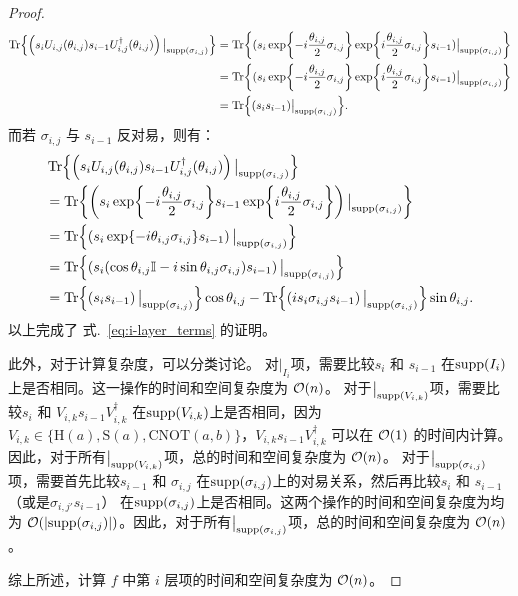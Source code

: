 \begin{proof}
    \begin{equation}
      \begin{aligned}
      \Tr{\left(s_i U_{i,j}(\theta_{i,j}) s_{i-1} U_{i,j}^\dagger(\theta_{i,j})\right)\big|_{\text{supp} \left( \sigma_{i,j} \right)}}
      &=\Tr{(s_i \exp{-i \frac{\theta_{i,j}}{2}\sigma_{i,j} }  \exp{i \frac{\theta_{i,j}}{2}\sigma_{i,j} }s_{i-1}) \big|_{\text{supp} \left( \sigma_{i,j} \right)}}\\
      &=\Tr{(s_i \exp{-i \frac{\theta_{i,j}}{2}\sigma_{i,j} } \exp{i \frac{\theta_{i,j}}{2}\sigma_{i,j} }s_{i-1}) \big|_{{\text{supp} \left( \sigma_{i,j} \right)}}}\\
      &=\Tr{(s_i s_{i-1})\big|_{{\text{supp} \left( \sigma_{i,j} \right)}}}.
    \end{aligned}
    \end{equation}
    而若 $\sigma_{i,j}$ 与 $s_{i-1}$ 反对易，则有：
    \begin{equation}
      \begin{aligned}
      &\Tr{\left(s_i U_{i,j}(\theta_{i,j}) s_{i-1} U_{i,j}^\dagger(\theta_{i,j})\right)\big|_{\text{supp} \left( \sigma_{i,j} \right)}}\\
      &=\Tr{ \left(s_i\exp{-i \frac{\theta_{i,j}}{2}\sigma_{i,j} } s_{i-1}\exp{i \frac{\theta_{i,j}}{2}\sigma_{i,j}}\right) \big|_{\text{supp} \left( \sigma_{i,j} \right)}}\\
      &=\Tr{\left( s_i  \exp{-i\theta_{i,j}\sigma_{i,j}} s_{i-1}\right) \big|_{\text{supp} \left( \sigma_{i,j} \right)}}\\
      &=\Tr{ \left(s_i (\cos{\theta_{i,j}}\mathbb{I}-i\sin{\theta_{i,j}}\sigma_{i,j}) s_{i-1} \right) \big|_{\text{supp} \left( \sigma_{i,j} \right)}}\\
      &=\Tr{\left(s_i s_{i-1}\right)\big|_{\text{supp} \left( \sigma_{i,j} \right)}}\cos{\theta_{i,j}}-\Tr{\left(i s_i \sigma_{i,j}s_{i-1}\right)\big|_{\text{supp} \left( \sigma_{i,j} \right)}}\sin{\theta_{i,j}}.
    \end{aligned}
    \end{equation}
    以上完成了 式.~\eqref{eq:i-layer_terms} 的证明。

    此外，对于计算复杂度，可以分类讨论。
    对$\big|_{I_i}$项，需要比较$s_i$ 和 $s_{i-1}$ 在$\text{supp}(I_i)$上是否相同。这一操作的时间和空间复杂度为 $\order{n}$。
    对于$\big|_{\text{supp} \left( V_{i,k} \right)}$项，需要比较$s_i$ 和 $V_{i,k}s_{i-1}V_{i,k}^\dagger$ 在$\text{supp}(V_{i,k})$上是否相同，因为 $V_{i,k}\in\{\mathrm{H}(a),\mathrm{S}(a),\mathrm{CNOT}(a,b)\}$，$V_{i,k}s_{i-1}V_{i,k}^\dagger$ 可以在 $\order{1}$ 的时间内计算。因此，对于所有$\big|_{\text{supp} \left( V_{i,k} \right)}$项，总的时间和空间复杂度为 $\order{n}$。
    对于$\big|_{\text{supp} \left( \sigma_{i,j} \right)}$项，需要首先比较$s_{i-1}$ 和 $\sigma_{i,j}$ 在$\text{supp}(\sigma_{i,j})$上的对易关系，然后再比较$s_i$ 和 $s_{i-1}$（或是$\sigma_{i,j'}s_{i-1}$） 在$\text{supp}(\sigma_{i,j})$上是否相同。这两个操作的时间和空间复杂度为均为 $\order{\abs{\supp(\sigma_{i,j})}}$。因此，对于所有$\big|_{\text{supp} \left( \sigma_{i,j} \right)}$项，总的时间和空间复杂度为 $\order{n}$。

    综上所述，计算 $f$ 中第 $i$ 层项的时间和空间复杂度为 $\order{n}$。
    \end{proof}


